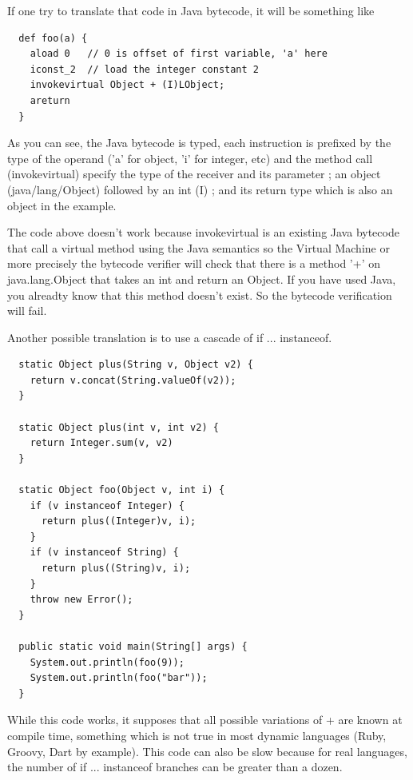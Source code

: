 \documentclass{sigplanconf}
\begin{document}
      If one try to translate that code in Java bytecode, it will be something like
      {\tiny      
      \begin{verbatim}
  def foo(a) {
    aload 0   // 0 is offset of first variable, 'a' here
    iconst_2  // load the integer constant 2
    invokevirtual Object + (I)LObject;
    areturn 
  }
      \end{verbatim}
      }

      As you can see, the Java bytecode is typed, each instruction is prefixed 
      by the type of the operand ('a' for object, 'i' for integer, etc)
      and the method call (invokevirtual) specify the type of the receiver and its parameter ;
      an object (java/lang/Object) followed by an int (I) ; and its return type
      which is also an object in the example.

      The code above doesn't work because invokevirtual is an existing Java bytecode that call
      a virtual method using the Java semantics so the Virtual Machine or more precisely
      the bytecode verifier will check that there is a method '+' on java.lang.Object
      that takes an int and return an Object. If you have used Java, you alreadty know
      that this method doesn't exist. So the bytecode verification will fail. 

      Another possible translation is to use a cascade of if ... instanceof.
      {\tiny      
      \begin{verbatim}
  static Object plus(String v, Object v2) {
    return v.concat(String.valueOf(v2));
  }

  static Object plus(int v, int v2) {
    return Integer.sum(v, v2)
  }

  static Object foo(Object v, int i) {
    if (v instanceof Integer) {
      return plus((Integer)v, i);
    }
    if (v instanceof String) {
      return plus((String)v, i);
    }
    throw new Error();
  }

  public static void main(String[] args) {
    System.out.println(foo(9));
    System.out.println(foo("bar"));
  }
      \end{verbatim}
      }

      While this code works, it supposes that all possible variations of + are known at compile time,
      something which is not true in most dynamic languages (Ruby, Groovy, Dart by example).
      This code can also be slow because for real languages, the number of if ... instanceof branches
      can be greater than a dozen. 
      
\end{document}

